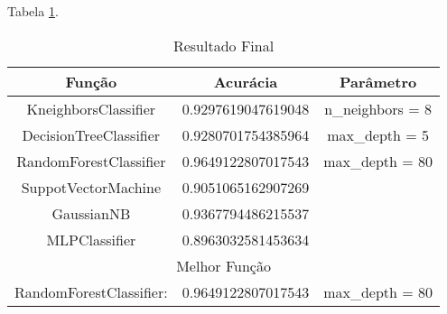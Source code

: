 Tabela \ref{tab:resultado}.

\setlength{\arrayrulewidth}{0.6mm}
\begin{table}[h!]
\centering
\begin{tabular}{ |c|c|c| }
 \hline
 Função                   & Acurácia           & Parâmetro  \\
 \hline
 KneighborsClassifier     & 0.9297619047619048 & n\_neighbors = 8  \\
 DecisionTreeClassifier   & 0.9280701754385964 & max\_depth = 5    \\
 RandomForestClassifier   & 0.9649122807017543 & max\_depth = 80   \\
 SuppotVectorMachine      & 0.9051065162907269 &                   \\
 GaussianNB               & 0.9367794486215537 &                   \\
 MLPClassifier            & 0.8963032581453634 &                   \\
 \hline
 \hline
 \multicolumn{3}{|c|}{ Melhor Função} \\
 \hline
 RandomForestClassifier:  & 0.9649122807017543 & max\_depth = 80   \\
 \hline
\end{tabular}
  \caption{Resultado Final}
\label{tab:resultado}
\end{table}









